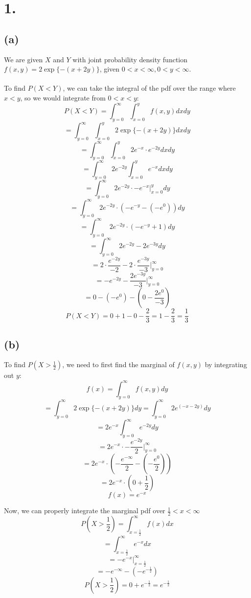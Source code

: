 \documentclass{article}
\begin{document}
\thispagestyle{firstpageheader}
{\Large 

\section*{1.}

\subsection*{(a)} 

We are given \(X\) and \(Y\) with joint probability density function \(f(x, y) = 2 \exp\{-(x + 2y)\}\), given \(0 < x < \infty, 0 < y < \infty\). \\ \\
To find \(P(X < Y)\), we can take the integral of the pdf over the range where \(x < y\), so we would integrate from \(0 < x < y\):
\[
  P(X < Y) = \int_{y=0}^{\infty} \int_{x=0}^{y} f(x, y) dx dy
\]
\[
  = \int_{y=0}^{\infty} \int_{x=0}^{y} 2 \exp\{-(x + 2y)\} dx dy
\]
\[
  = \int_{y=0}^{\infty} \int_{x=0}^{y} 2 e^{-x} \cdot  e^{-2y} dx dy
\]
\[
  = \int_{y=0}^{\infty} 2e^{-2y} \int_{x=0}^{y} e^{-x} dx dy
\]
\[
  = \int_{y=0}^{\infty} 2e^{-2y} \cdot -e^{-x}|_{x=0}^{y} dy
\]
\[
  = \int_{y=0}^{\infty} 2e^{-2y} \cdot (-e^{-y} - (-e^{0})) dy
\]
\[
  = \int_{y=0}^{\infty} 2e^{-2y} \cdot (-e^{-y} + 1) dy
\]
\[
  = \int_{y=0}^{\infty} 2e^{-2y} - 2e^{-3y} dy
\]
\[
  = 2 \cdot \frac{e^{-2y}}{-2} - 2 \cdot \frac{e^{-3y}}{-3} |_{y=0}^{\infty}
\]
\[
  = -e^{-2y} - \frac{2e^{-3y}}{-3} |_{y=0}^{\infty}
\]
\[
  = 0 - (-e^0) - (0 - \frac{2e^{0}}{-3})
\]
\[
  P(X < Y) = 0 + 1 - 0 - \frac{2}{3} = 1 - \frac{2}{3} = \boxed{\frac{1}{3}}
\]

\subsection*{(b)}

To find \(P(X > \frac{1}{2})\), we need to first find the marginal of \(f(x, y)\) by integrating out \(y\):
\[
  f(x) = \int_{y=0}^{\infty} f(x, y) dy
\]
\[
  = \int_{y=0}^{\infty} 2 \exp\{-(x + 2y)\} dy = \int_{y=0}^{\infty} 2 e^{(-x - 2y)} dy
\]
\[
  = 2e^{-x} \int_{y=0}^{\infty} e^{-2y} dy
\]
\[
  = 2e^{-x} \cdot -\frac{e^{-2y}}{2} |_{y=0}^{\infty}
\]
\[
  = 2e^{-x} \cdot (-\frac{e^{-\infty}}{2}-(-\frac{e^0}{2}))
\]
\[
  = 2e^{-x} \cdot (0 + \frac{1}{2})
\]
\[
  f(x) = e^{-x}
\]

Now, we can properly integrate the marginal pdf over \(\frac{1}{2} < x < \infty\)
\[
  P(X > \frac{1}{2}) = \int_{x=\frac{1}{2}}^{\infty} f(x) dx
\]
\[
  = \int_{x=\frac{1}{2}}^{\infty} e^{-x} dx
\]
\[
  = -e^{-x} |_{x=\frac{1}{2}}^{\infty}
\]
\[
  = -e^{-\infty} - (-e^{-\frac{1}{2}}) 
\]
\[
  P(X > \frac{1}{2}) = 0 + e^{-\frac{1}{2}} = \boxed{e^{-\frac{1}{2}}}
\]



}
\end{document}
